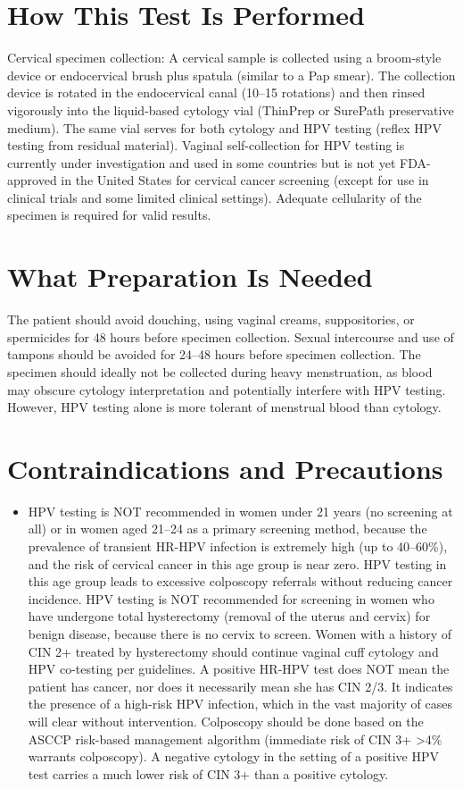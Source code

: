 \section*{How This Test Is Performed}
Cervical specimen collection: A cervical sample is collected using a broom-style device or endocervical brush plus spatula (similar to a Pap smear). The collection device is rotated in the endocervical canal (10--15 rotations) and then rinsed vigorously into the liquid-based cytology vial (ThinPrep or SurePath preservative medium). The same vial serves for both cytology and HPV testing (reflex HPV testing from residual material). Vaginal self-collection for HPV testing is currently under investigation and used in some countries but is not yet FDA-approved in the United States for cervical cancer screening (except for use in clinical trials and some limited clinical settings). Adequate cellularity of the specimen is required for valid results.

\section*{What Preparation Is Needed}
The patient should avoid douching, using vaginal creams, suppositories, or spermicides for 48 hours before specimen collection. Sexual intercourse and use of tampons should be avoided for 24--48 hours before specimen collection. The specimen should ideally not be collected during heavy menstruation, as blood may obscure cytology interpretation and potentially interfere with HPV testing. However, HPV testing alone is more tolerant of menstrual blood than cytology.

\section*{Contraindications and Precautions}
\begin{itemize}
  \item HPV testing is NOT recommended in women under 21 years (no screening at all) or in women aged 21--24 as a primary screening method, because the prevalence of transient HR-HPV infection is extremely high (up to 40--60\%), and the risk of cervical cancer in this age group is near zero. HPV testing in this age group leads to excessive colposcopy referrals without reducing cancer incidence. HPV testing is NOT recommended for screening in women who have undergone total hysterectomy (removal of the uterus and cervix) for benign disease, because there is no cervix to screen. Women with a history of CIN 2+ treated by hysterectomy should continue vaginal cuff cytology and HPV co-testing per guidelines. A positive HR-HPV test does NOT mean the patient has cancer, nor does it necessarily mean she has CIN 2/3. It indicates the presence of a high-risk HPV infection, which in the vast majority of cases will clear without intervention. Colposcopy should be done based on the ASCCP risk-based management algorithm (immediate risk of CIN 3+ >4\% warrants colposcopy). A negative cytology in the setting of a positive HPV test carries a much lower risk of CIN 3+ than a positive cytology.
\end{itemize}
